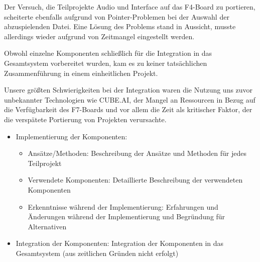 Der Versuch, die Teilprojekte Audio und Interface auf das F4-Board zu portieren, scheiterte ebenfalls aufgrund von Pointer-Problemen bei der Auswahl der abzuspielenden Datei. Eine Lösung des Problems stand in Aussicht, musste allerdings wieder aufgrund von Zeitmangel eingestellt werden.

Obwohl einzelne Komponenten schließlich für die Integration in das Gesamtsystem vorbereitet wurden, kam es zu keiner tatsächlichen Zusammenführung in einem einheitlichen Projekt.

Unsere größten Schwierigkeiten bei der Integration waren die Nutzung uns zuvor unbekannter Technologien wie CUBE.AI, der Mangel an Ressourcen in Bezug auf die Verfügbarkeit des F7-Boards und vor allem die Zeit als kritischer Faktor, der die verspätete Portierung von Projekten verursachte.

\begin{itemize}

	\item Implementierung der Komponenten:
	\begin{itemize}
		\item Ansätze/Methoden: Beschreibung der Ansätze und Methoden für jedes Teilprojekt
		\item Verwendete Komponenten: Detaillierte Beschreibung der verwendeten Komponenten
		\item Erkenntnisse während der Implementierung: Erfahrungen und Änderungen während der Implementierung und Begründung für Alternativen
	\end{itemize}
	\item Integration der Komponenten: Integration der Komponenten in das Gesamtsystem (aus zeitlichen Gründen nicht erfolgt)
\end{itemize}


